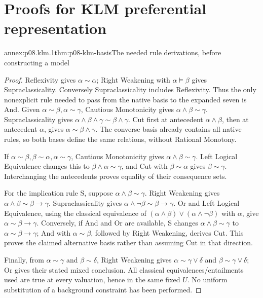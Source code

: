 \section{Proofs for KLM preferential representation}
\label{annex:p08-klm-preferential-representation}

\begin{annexitem}{annex:p08.klm.1}{thm:p08-klm-basis}{The needed rule derivations, before constructing a model}
\begin{proof}
Reflexivity gives \(\alpha\sim\alpha\); Right Weakening with
\(\alpha\models\beta\) gives Supraclassicality. Conversely
Supraclassicality includes Reflexivity. Thus the only nonexplicit rule
needed to pass from the native basis to the expanded seven is And.
Given \(\alpha\sim\beta,\alpha\sim\gamma\), Cautious Monotonicity
gives \(\alpha\wedge\beta\sim\gamma\). Supraclassicality gives
\(\alpha\wedge\beta\wedge\gamma\sim\beta\wedge\gamma\).
Cut first at antecedent \(\alpha\wedge\beta\), then at antecedent
\(\alpha\), gives \(\alpha\sim\beta\wedge\gamma\).
The converse basis already contains all native rules, so both bases
define the same relations, without Rational Monotony.

If \(\alpha\sim\beta,\beta\sim\alpha,\alpha\sim\gamma\),
Cautious Monotonicity gives \(\alpha\wedge\beta\sim\gamma\).
Left Logical Equivalence changes this to \(\beta\wedge\alpha\sim\gamma\),
and Cut with \(\beta\sim\alpha\) gives \(\beta\sim\gamma\).
Interchanging the antecedents proves equality of their consequence sets.

For the implication rule S, suppose \(\alpha\wedge\beta\sim\gamma\).
Right Weakening gives \(\alpha\wedge\beta\sim\beta\to\gamma\).
Supraclassicality gives
\(\alpha\wedge\neg\beta\sim\beta\to\gamma\).
Or and Left Logical Equivalence, using the classical equivalence of
\((\alpha\wedge\beta)\vee(\alpha\wedge\neg\beta)\) with \(\alpha\),
give \(\alpha\sim\beta\to\gamma\). Conversely, if And and Or
are available, S changes \(\alpha\wedge\beta\sim\gamma\) to
\(\alpha\sim\beta\to\gamma\); And with \(\alpha\sim\beta\),
followed by Right Weakening, derives Cut. This proves the claimed
alternative basis rather than assuming Cut in that direction.

Finally, from \(\alpha\sim\gamma\) and \(\beta\sim\delta\),
Right Weakening gives \(\alpha\sim\gamma\vee\delta\) and
\(\beta\sim\gamma\vee\delta\); Or gives their stated mixed
conclusion. All classical equivalences/entailments used are true at
every valuation, hence in the same fixed \(U\). No uniform substitution
of a background constraint has been performed.
\end{proof}
\end{annexitem}

